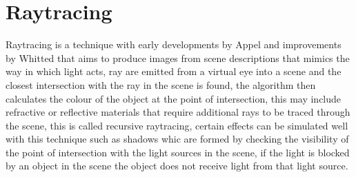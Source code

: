 %


\section{Raytracing}
Raytracing is a technique with early developments by Appel \cite{Appel68} and improvements by Whitted \cite{whitted79a} that aims to produce images from scene descriptions that mimics the way
in which light acts, ray are emitted from a virtual eye into a scene and the closest intersection with the ray in the scene is
found, the algorithm then calculates the colour of the object at the point of intersection, this may include refractive or
reflective materials that require additional rays to be traced through the scene, this is called recursive raytracing, certain effects can be simulated well with this technique such as shadows whic are formed by checking the visibility
of the point of intersection with the light sources in the scene, if the light is blocked by an object in the scene
the object does not receive light from that light source.
